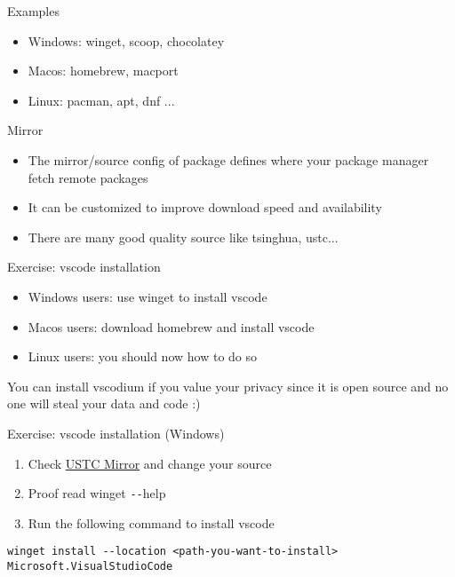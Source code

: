 \begin{frame}[fragile]{Examples}
	\begin{itemize}
		\item Windows: winget, scoop, chocolatey
		\item Macos: homebrew, macport
		\item Linux: pacman, apt, dnf ...
	\end{itemize}
\end{frame}

\begin{frame}[fragile]{Mirror}
	\begin{itemize}
		\item The mirror/source config of package defines where your package manager fetch remote packages
		\item It can be customized to improve download speed and availability
		\item There are many good quality source like tsinghua, ustc...
	\end{itemize}
\end{frame}

\begin{frame}[fragile]{Exercise: vscode installation}
	\begin{itemize}
		\item Windows users: use winget to install vscode
		\item Macos users: download homebrew and install vscode
		\item Linux users: you should now how to do so
	\end{itemize}

	You can install vscodium if you value your privacy since it is open source and no one will steal your data and code :)
\end{frame}

\begin{frame}[fragile]{Exercise: vscode installation (Windows)}
	\begin{enumerate}
		\item Check \href{https://mirrors.ustc.edu.cn/help/winget-source.html}{USTC Mirror} and change your source
		\item Proof read winget \verb|--|help
		\item Run the following command to install vscode
	\end{enumerate}
	\begin{verbatim}
winget install --location <path-you-want-to-install> Microsoft.VisualStudioCode
	\end{verbatim}
		
\end{frame}

